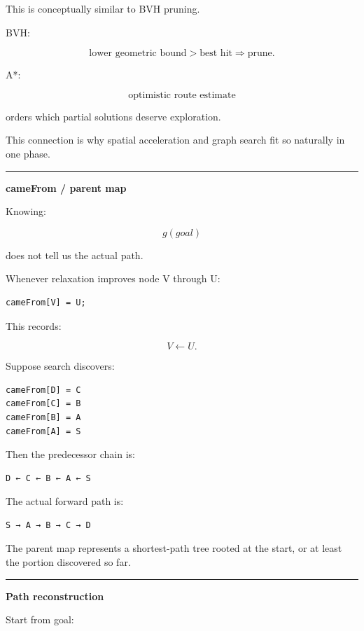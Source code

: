 This is conceptually similar to BVH pruning.

BVH:

\[
\text{lower geometric bound}>
\text{best hit}
\Rightarrow
\text{prune}.
\]

A*:

\[
\text{optimistic route estimate}
\]

orders which partial solutions deserve exploration.

This connection is why spatial acceleration and graph search fit so naturally in one phase.

\begin{center}\rule{0.5\linewidth}{0.5pt}\end{center}

\textbf{cameFrom / parent map}

Knowing:

\[
g(goal)
\]

does not tell us the actual path.

Whenever relaxation improves node V through U:

\begin{verbatim}
cameFrom[V] = U;
\end{verbatim}

This records:

\[
V\leftarrow U.
\]

Suppose search discovers:

\begin{verbatim}
cameFrom[D] = C
cameFrom[C] = B
cameFrom[B] = A
cameFrom[A] = S
\end{verbatim}

Then the predecessor chain is:

\begin{verbatim}
D ← C ← B ← A ← S
\end{verbatim}

The actual forward path is:

\begin{verbatim}
S → A → B → C → D
\end{verbatim}

The parent map represents a shortest-path tree rooted at the start, or at least the portion discovered so far.

\begin{center}\rule{0.5\linewidth}{0.5pt}\end{center}

\textbf{Path reconstruction}

Start from goal:


